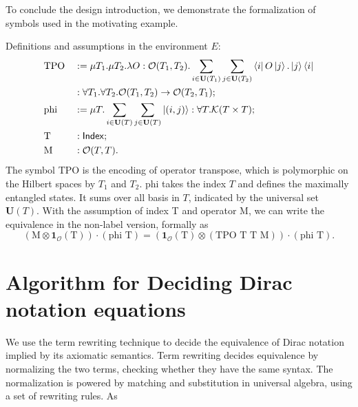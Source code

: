 \documentclass[runningheads]{llncs}
\begin{document}
To conclude the design introduction, we demonstrate the formalization of symbols used in the motivating example.
\begin{example}
    \label{ex: formalizing motivating}
    Definitions and assumptions in the environment $E$:
    \begin{align*}
        & \textrm{TPO} && := \mu T_1. \mu T_2. \lambda O : \mathcal{O}(T_1, T_2). \sum_{i \in \mathbf{U}(T_1)} \sum_{j \in \mathbf{U}(T_2)} \bra{i} O \ket{j} . \ket{j}\bra{i} \\
        & && : \forall T_1. \forall T_2. \mathcal{O}(T_1, T_2) \to \mathcal{O}(T_2, T_1); \\
        & \textrm{phi} && := \mu T. \sum_{i \in \mathbf{U}(T)} \sum_{j \in \mathbf{U}(T)} \ket{(i, j)} : \forall T.\mathcal{K}(T \times T); \\
        & \textrm{T} && : \mathsf{Index}; \\
        & \textrm{M} && : \mathcal{O}(T, T).
    \end{align*}
    The symbol TPO is the encoding of operator transpose, which is polymorphic on the Hilbert spaces by $T_1$ and $T_2$.
    phi takes the index $T$ and defines the maximally entangled states. It sums over all basis in $T$, indicated by the universal set $\mathbf{U}(T)$.
    With the assumption of index T and operator M, we can write the equivalence in the non-label version, formally as 
    \[
        (\textrm{M} \otimes \mathbf{1}_\mathcal{O}(\textrm{T})) \cdot (\textrm{phi T}) = (\mathbf{1}_\mathcal{O}(\textrm{T}) \otimes (\textrm{TPO T T M})) \cdot (\textrm{phi T}).
    \]
\end{example}





\section{Algorithm for Deciding Dirac notation equations}
\label{sec: decide}

We use the term rewriting technique to decide the equivalence of Dirac notation implied by its axiomatic semantics.
Term rewriting decides equivalence by normalizing the two terms, checking whether they have the same syntax.
The normalization is powered by matching and substitution in universal algebra, using a set of rewriting rules.
As 

\end{document}
